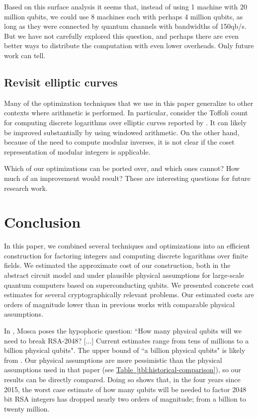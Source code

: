 \documentclass[superscriptaddress,notitlepage,longbibliography]{revtex4-1}
\theoremstyle{definition}
\theoremstyle{definition}
\newcommand{\tbl}[1]{\hyperref[tbl:#1]{Table~\ref*{tbl:#1}}}
\begin{document}
Based on this surface analysis it seems that, instead of using 1 machine with 20 million qubits, we could use 8 machines each with perhaps 4 million qubits, as long as they were connected by quantum channels with bandwidths of 150qb/s.
But we have not carefully explored this question, and perhaps there are even better ways to distribute the computation with even lower overheads.
Only future work can tell.

\subsection{Revisit elliptic curves}
\label{sec:revisit-elliptic-curves}

Many of the optimization techniques that we use in this paper generalize to other contexts where arithmetic is performed.
In particular, consider the Toffoli count for computing discrete logarithms over elliptic curves reported by \cite{roetteler2017quantum}.
It can likely be improved substantially by using windowed arithmetic.
On the other hand, because of the need to compute modular inverses, it is not clear if the coset representation of modular integers is applicable.

Which of our optimizations can be ported over, and which ones cannot?
How much of an improvement would result?
These are interesting questions for future research work.




\section{Conclusion}
\label{sec:conclusion}

In this paper, we combined several techniques and optimizations into an efficient construction for factoring integers and computing discrete logarithms over finite fields.
We estimated the approximate cost of our construction, both in the abstract circuit model and under plausible physical assumptions for large-scale quantum computers based on superconducting qubits.
We presented concrete cost estimates for several cryptographically relevant problems.
Our estimated costs are orders of magnitude lower than in previous works with comparable physical assumptions.

In \cite{mosca2018cybersecurity}, Mosca poses the hypophoric question: ``How many physical qubits will we need to break RSA-2048? [...] Current estimates range from tens of millions to a billion physical qubits".
The upper bound of ``a billion physical qubits" is likely from \cite{fowler2012surfacecodereview}.
Our physical assumptions are more pessimistic than the physical assumptions used in that paper (see \tbl{historical-comparison}), so our results can be directly compared.
Doing so shows that, in the four years since 2015, the worst case estimate of how many qubits will be needed to factor 2048 bit RSA integers has dropped nearly two orders of magnitude; from a billion to twenty million.
\end{document}
